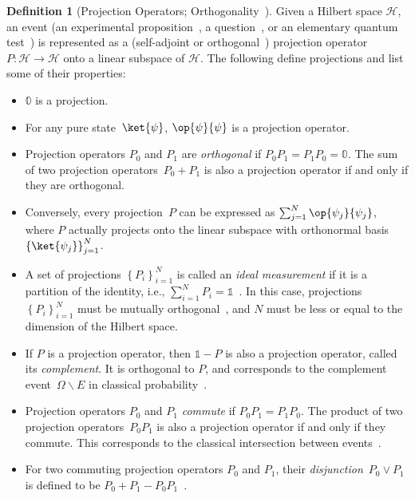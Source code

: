 \documentclass[12pt]{iopart}
\theoremstyle{plain}
\theoremstyle{definition}
\newtheorem{definition}[thm]{Definition}
\theoremstyle{remark}
\newcommand{\Hilb}{\mathcal{H}}
\newcommand{\proj}[1]{\op{#1}{#1}}
\begin{document}
\begin{definition}[Projection Operators; Orthogonality~\cite{10.2307/2308516,Redhead1987-REDINA,peres1995quantum,Griffiths2003,Swart2013}]
  \label{def:Projection} Given a Hilbert space $\Hilb$, an event (an
  experimental proposition~\cite{BirkhoffVonNeumann1936}, a
  question~\cite{10.2307/2308516,Abramsky2012},
  or an elementary quantum test~\cite{peres1995quantum}) is represented
  as a (self-adjoint or orthogonal~\cite {Griffiths2003,Maassen2010})
  projection operator $P:\Hilb\rightarrow\Hilb$ onto a linear subspace
  of $\Hilb$. The following define projections and list some of their properties:
\begin{itemize}
\item $\mathbb{0}$ is a projection. 
\item For any pure state~$\ket{\psi}$, $\proj{\psi}$ is a projection
operator. 
\item Projection operators $P_{0}$ and $P_{1}$ are \emph{orthogonal}
  if $P_{0}P_{1}=P_{1}P_{0}=\mathbb{0}$. The sum of two projection
  operators~$P_{0}+P_{1}$ is also a projection operator if and only if
  they are orthogonal.
\item Conversely, every projection~$P$ can be expressed as
  $\sum_{j=1}^{N}\proj{\psi_{j}}$, where $P$ actually projects onto
  the linear subspace with orthonormal
  basis~$\left\{ \ket{\psi_{j}}\right\} _{j=1}^{N}$.
\item A set of projections $\left\{ P_{i}\right\} _{i=1}^{N}$ is
  called an \emph{ideal measurement} if it is a partition of the
  identity, i.e., $\sum_{i=1}^{N}P_{i}=\mathbb{1}$~\cite{Swart2013}.
  In this case, projections $\left\{ P_{i}\right\} _{i=1}^{N}$ must
  be mutually orthogonal~\cite{Griffiths2003,Halmos1957}, and $N$ must be less
  or equal to the dimension of the Hilbert space.
\item If $P$ is a projection operator, then $\mathbb{1}-P$ is also a
  projection operator, called its \emph{complement}. It is orthogonal to
  $P$, and corresponds to the complement event~$\Omega\backslash E$ in
  classical probability~\cite{Griffiths2003}.
\item Projection operators $P_{0}$ and $P_{1}$ \emph{commute} if $P_{0}P_{1}=P_{1}P_{0}$.
The product of two projection operators~$P_{0}P_{1}$ is also a projection
operator if and only if they commute. This corresponds to the classical
intersection between events~\cite{peres1995quantum,Griffiths2003}. 
\item For two commuting projection operators $P_{0}$ and $P_{1}$,
  their \emph{disjunction}~$P_{0}\vee P_{1}$ is defined to be
  $P_{0}+P_{1}-P_{0}P_{1}$~\cite{Griffiths2003}.
\end{itemize}
\end{definition}
\end{document}
